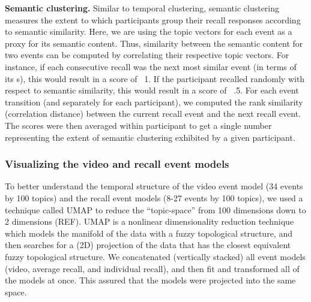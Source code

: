 \documentclass{article}
\begin{document}
{\textbf{Semantic clustering.} Similar to temporal clustering, semantic clustering measures the extent to which participants group their recall responses according to semantic similarity. Here, we are using the topic vectors for each event as a proxy for its semantic content. Thus, similarity between the semantic content for two events can be computed by correlating their respective topic vectors.  For instance, if each consecutive recall was the next most similar event (in terms of its s), this would result in a score of ~1. If the participant recalled randomly with respect to semantic similarity, this would result in a score of ~.5.  For each event transition (and separately for each participant), we computed the rank similarity (correlation distance) between the current recall event and the next recall event. The scores were then averaged within participant to get a single number representing the extent of semantic clustering exhibited by a given participant.

\subsubsection{Visualizing the video and recall event models}

To better understand the temporal structure of the video event model (34 events by 100 topics) and the recall event models (8-27 events by 100 topics), we used a technique called UMAP to reduce the ``topic-space'' from 100 dimensions down to 2 dimensions (REF). UMAP is a nonlinear dimensionality reduction technique which models the manifold of the data with a fuzzy topological structure, and then searches for a (2D) projection of the data that has the closest equivalent fuzzy topological structure. We concatenated (vertically stacked) all event models (video, average recall, and individual recall), and then fit and transformed all of the models at once. This assured that the models were projected into the same space.

}
\end{document}
